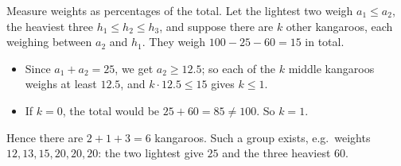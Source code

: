 Measure weights as percentages of the total. Let the lightest two weigh $a_1\le a_2$, the heaviest three $h_1\le h_2\le h_3$, and suppose there are $k$ other kangaroos, each weighing between $a_2$ and $h_1$. They weigh $100-25-60=15$ in total.
\begin{itemize}
\item Since $a_1+a_2=25$, we get $a_2\ge12.5$; so each of the $k$ middle kangaroos weighs at least $12.5$, and $k\cdot12.5\le15$ gives $k\le1$.
\item If $k=0$, the total would be $25+60=85\ne100$. So $k=1$.
\end{itemize}
Hence there are $2+1+3=\boxed{6}$ kangaroos. Such a group exists, e.g.\ weights $12,13,15,20,20,20$: the two lightest give $25$ and the three heaviest $60$.
